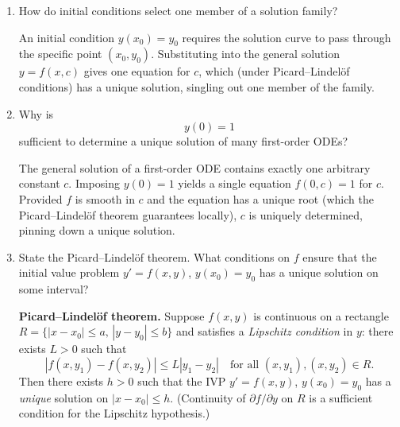 \documentclass{essay}
\begin{document}
\begin{enumerate}[leftmargin=*, itemsep=8pt]
    \begin{answer} A first-order ODE specifies the slope $y'$ at
      each point but does not fix which curve passes through a given
      point.  Each choice of integration constant $c$ selects a
      different integral curve; collectively these integral
      curves---one for each $c$---form a one-parameter family that
      ``fills'' the plane (under good conditions without crossings),
      and the ODE governs all of them simultaneously.
    \end{answer}

  \item How do initial conditions select one member of a solution family?

    \begin{answer} An initial condition $y(x_0)=y_0$ requires the
      solution curve to pass through the specific point $(x_0,y_0)$.
      Substituting into the general solution $y=f(x,c)$ gives one
      equation for $c$, which (under Picard--Lindelöf conditions) has a
      unique solution, singling out one member of the family.
    \end{answer}

  \item Why is \[ y(0)=1 \] sufficient to determine a unique solution
    of many first-order ODEs?

    \begin{answer} The general solution of a first-order ODE
      contains exactly one arbitrary constant $c$.  Imposing $y(0)=1$
      yields a single equation $f(0,c)=1$ for $c$.  Provided $f$ is
      smooth in $c$ and the equation has a unique root (which the
      Picard--Lindelöf theorem guarantees locally), $c$ is uniquely
      determined, pinning down a unique solution.
    \end{answer}

  \item State the Picard--Lindel\"of theorem. What conditions on $f$
    ensure that the initial value problem $y'=f(x,y)$, $y(x_0)=y_0$
    has a unique solution on some interval?

    \begin{answer} \textbf{Picard--Lindelöf theorem.}  Suppose
      $f(x,y)$ is continuous on a rectangle $R=\{|x-x_0|\le
      a,\,|y-y_0|\le b\}$ and satisfies a \emph{Lipschitz condition} in
      $y$: there exists $L>0$ such that
      \[
        |f(x,y_1)-f(x,y_2)| \le L|y_1-y_2| \quad \text{for all }
        (x,y_1),(x,y_2)\in R.
      \]
      Then there exists $h>0$ such that the IVP $y'=f(x,y)$,
      $y(x_0)=y_0$ has a \emph{unique} solution on $|x-x_0|\le h$.
      (Continuity of $\partial f/\partial y$ on $R$ is a sufficient
      condition for the Lipschitz hypothesis.)
    \end{answer}


\end{enumerate}
\end{document}
